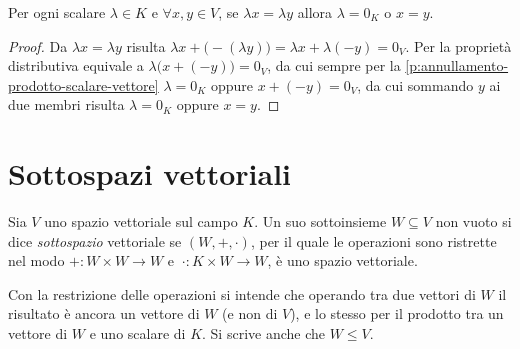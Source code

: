 \begin{proprieta} \label{p:cancellazione-scalare}
	Per ogni scalare $\lambda\in K$ e $\forall x,y\in V$, se $\lambda x=\lambda y$ allora $\lambda=0_K$ o $x=y$.
\end{proprieta}
\begin{proof}
	Da $\lambda x=\lambda y$ risulta $\lambda x+\big(-(\lambda y)\big)=\lambda x+\lambda(-y)=0_V$.
	Per la proprietà distributiva equivale a $\lambda\big(x+(-y)\big)=0_V$, da cui sempre per la \ref{p:annullamento-prodotto-scalare-vettore} $\lambda=0_K$ oppure $  x+(-y)=0_V$, da cui sommando $y$ ai due membri risulta $\lambda=0_K$ oppure $x=y$.
\end{proof}

\section{Sottospazi vettoriali} \label{ref:sottospazi-vettoriali}
\begin{definizione} \label{d:sottospazio-vettoriale}
	Sia $V$ uno spazio vettoriale sul campo $K$.
	Un suo sottoinsieme $W\subseteq V$ non vuoto si dice \emph{sottospazio} vettoriale se $(W,+,\cdot)$, per il quale le operazioni sono ristrette nel modo $+\colon W\times W\to W$ e $\ \cdot\colon K\times W\to W$, è uno spazio vettoriale.
\end{definizione}
Con la restrizione delle operazioni si intende che operando tra due vettori di $W$ il risultato è ancora un vettore di $W$ (e non di $V$), e lo stesso per il prodotto tra un vettore di $W$ e uno scalare di $K$. Si scrive anche che $W\leq V$.
